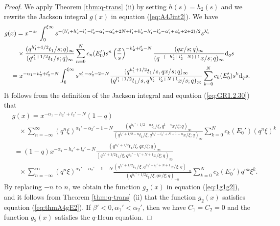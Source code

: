 \documentclass[12pt]{amsart}
\numberwithin{equation}{section}
\theoremstyle{definition}
\theoremstyle{remark}
\begin{document}
\begin{proof}
We apply Theorem \ref{thm:q-trans} (ii) by setting $h(s)=h_2(s)$ and we rewrite the Jackson integral $g(x)$ in equation (\ref{eq:A4Jint2}). 
We have
  \begin{align*}
  &  g(x) = x^{-\alpha_{1}} \int_{0}^{\xi \infty} s^{-(h_{1}' + h_{2}' - l_{1}' - l_{2}' - \alpha_{1}' - \alpha_{2}' + 2N + l_{1}' + h_{2}' - h_{1}' - l_{2}' - \alpha_{1}' + \alpha_{2}'  + 2 + 2)/2} s^{\lambda_{1}'}  \\
    &\qquad \times \frac{(q^{h_{1}' + 1/2}t_{1}/s; q)_\infty}{(q^{l_{1}' + 1/2}t_{1}/s; q)_\infty} \sum_{n = 0}^{N} c_{n} (E_{0}') s^{n} \left(\frac{x}{s} \right)^{-h_{2}' + l_{2}' - N} \frac{(qx/s; q)_{\infty}}{(q^{-(-h_{2}' + l_{2}' - N) + 1} x/s; q)_{\infty}} {\rm{d}}_{q}s \\
    & \quad = x^{-\alpha_{1} -h_{2}' + l_{2}' - N} \int_{0}^{\xi \infty} s^{\alpha_{1}' - \alpha_{2}' - 2 - N} \frac{(q^{h_{1}' + 1/2}t_{1}/s, qx/s; q)_\infty}{(q^{l_{1}' + 1/2}t_{1}/s, q^{h_{2}' - l_{2}' + N + 1} x/s; q)_\infty} \sum_{k = 0}^{N} c_{k} (E_{0}')  s^{k} {\rm{d}}_{q}s . 
  \end{align*}
It follows from the definition of the Jackson integral and equation (\ref{eq:GR1.2.30}) that
  \begin{align*}
  &  g(x) = x^{-\alpha_{1} -h_{2}' + l_{2}' - N} (1 - q) \\
    & \quad \times \sum_{n = - \infty}^{\infty} (q^{n}\xi)^{\alpha_{1}' - \alpha_{2}' - 1 - N} \frac{(q^{h_{1}' + 1/2 - n}t_{1}/\xi, q^{1 - n}x/\xi; q)_\infty}{(q^{l_{1}' + 1/2 - n}t_{1}/\xi, q^{h_{2}' - l_{2}' + N + 1 -n}x/\xi; q)_\infty} \sum_{k = 0}^{N} c_{k} (E_{0}') (q^{n}\xi)^{k} \\
    & \; = (1 - q) x^{-\alpha_{1} -h_{2}' + l_{2}' - N} \frac{(q^{h_{1}' + 1/2}t_{1}/\xi, qx/\xi; q)_\infty}{(q^{l_{1}' + 1/2}t_{1}/\xi, q^{h_{2}' - l_{2}' + N + 1}x/\xi; q)_\infty} \\
    & \quad \times \sum_{n = - \infty}^{\infty} (q^{n}\xi)^{\alpha_{1}' - \alpha_{2}' - 1 - N} \frac{(q^{l_{1}' + 1/2}t_{1}/\xi, q^{h_{2}' - l_{2}' + N + 1}x/\xi; q)_{-n}}{(q^{h_{1}' + 1/2}t_{1}/\xi, qx/\xi; q)_{-n}}  \sum_{k = 0}^{N} c_{k} (E_{0}') q^{nk} \xi^{k} .
  \end{align*}
By replacing $-n$ to $n$, we obtain the function $g_2 (x)$ in equation (\ref{eq:1g1g2}), and it follows from Theorem \ref{thm:q-trans} (ii) that the function $g_2 (x)$ satisfies equation (\ref{eq:thmA4gE2}).
If $\beta' < 0, \alpha_{1}' < \alpha_{2}'$, then we have $C_1=C_2=0$ and the function $g_2 (x)$ satisfies the $q$-Heun equation.
\end{proof}
\end{document}
